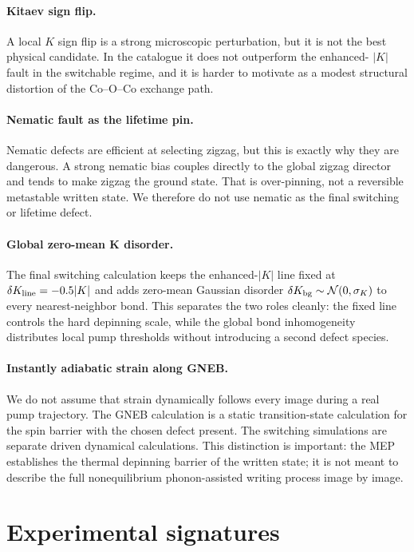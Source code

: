 \documentclass[aps,prb,twocolumn,superscriptaddress,floatfix,nofootinbib]{revtex4-2}
\begin{document}
\paragraph{Kitaev sign flip.}
A local $K$ sign flip is a strong microscopic perturbation, but it is not the
best physical candidate.  In the catalogue it does not outperform the enhanced-
$|K|$ fault in the switchable regime, and it is harder to motivate as a modest
structural distortion of the Co--O--Co exchange path.

\paragraph{Nematic fault as the lifetime pin.}
Nematic defects are efficient at selecting zigzag, but this is exactly why they
are dangerous.  A strong nematic bias couples directly to the global zigzag
director and tends to make zigzag the ground state.  That is over-pinning, not a
reversible metastable written state.  We therefore do not use nematic as the
final switching or lifetime defect.

\paragraph{Global zero-mean K disorder.}
The final switching calculation keeps the enhanced-$|K|$ line fixed at
$\delta K_{\rm line}=-0.5|K|$ and adds zero-mean Gaussian disorder
$\delta K_{\rm bg}\sim\mathcal N(0,\sigma_K)$ to every nearest-neighbor bond.
This separates the two roles cleanly: the fixed line controls the hard depinning
scale, while the global bond inhomogeneity distributes local pump thresholds
without introducing a second defect species.

\paragraph{Instantly adiabatic strain along GNEB.}
We do not assume that strain dynamically follows every image during a real pump
trajectory.  The GNEB calculation is a static transition-state calculation for
the spin barrier with the chosen defect present.  The switching simulations are
separate driven dynamical calculations.  This distinction is important: the MEP
establishes the thermal depinning barrier of the written state; it is not meant
to describe the full nonequilibrium phonon-assisted writing process image by
image.

\section{Experimental signatures}
\end{document}
